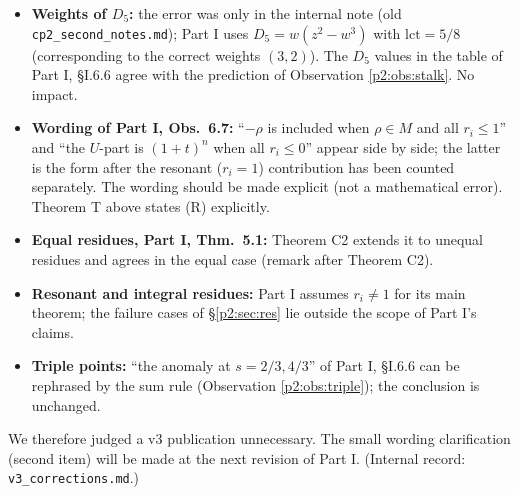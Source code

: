 \begin{itemize}
\item \textbf{Weights of $D_5$:} the error was only in the internal note (old \texttt{cp2\_second\_notes.md}); Part I uses $D_5=w(z^2-w^3)$ with $\mathrm{lct}=5/8$ (corresponding to the correct weights $(3,2)$). The $D_5$ values in the table of Part I, \S I.6.6 agree with the prediction of Observation \ref{p2:obs:stalk}. No impact.\tV
\item \textbf{Wording of Part I, Obs.\ 6.7:} ``$-\rho$ is included when $\rho\in M$ and all $r_i\le1$'' and ``the $U$-part is $(1+t)^n$ when all $r_i\le0$'' appear side by side; the latter is the form after the resonant ($r_i=1$) contribution has been counted separately. The wording should be made explicit (not a mathematical error). Theorem T above states (R) explicitly.
\item \textbf{Equal residues, Part I, Thm.\ 5.1:} Theorem C2 extends it to unequal residues and agrees in the equal case (remark after Theorem C2).
\item \textbf{Resonant and integral residues:} Part I assumes $r_i\ne1$ for its main theorem; the failure cases of \S\ref{p2:sec:res} lie outside the scope of Part I's claims.
\item \textbf{Triple points:} ``the anomaly at $s=2/3,4/3$'' of Part I, \S I.6.6 can be rephrased by the sum rule (Observation \ref{p2:obs:triple}); the conclusion is unchanged.
\end{itemize}
We therefore judged a v3 publication unnecessary. The small wording clarification (second item) will be made at the next revision of Part I. (Internal record: \texttt{v3\_corrections.md}.)

